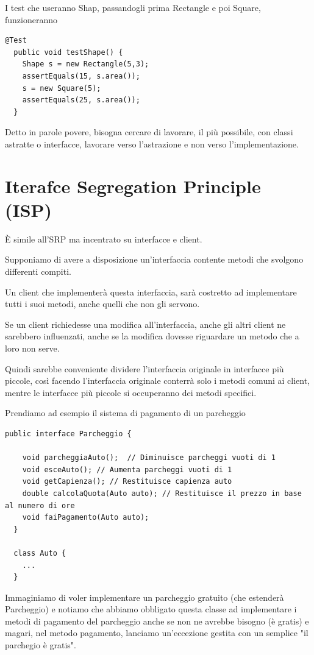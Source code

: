 I test che useranno Shap, passandogli prima Rectangle e poi Square, funzioneranno
\begin{lstlisting}[linewidth=6cm]
  @Test
  public void testShape() {
    Shape s = new Rectangle(5,3);
    assertEquals(15, s.area());
    s = new Square(5);
    assertEquals(25, s.area());
  }  
\end{lstlisting}

Detto in parole povere, bisogna cercare di lavorare, il più possibile, con classi astratte o interfacce, lavorare verso l'astrazione e non verso l'implementazione.

\newpage
\section{Iterafce Segregation Principle (ISP)}

È simile all’SRP ma incentrato su interfacce e client.

Supponiamo di avere a disposizione un'interfaccia contente metodi che svolgono differenti compiti.

Un client che implementerà questa interfaccia, sarà costretto ad implementare tutti i suoi metodi, anche quelli che non gli servono.

Se un client richiedesse una modifica all’interfaccia, anche gli altri client ne sarebbero influenzati, anche se la modifica dovesse riguardare un metodo che a loro
non serve.

Quindi sarebbe conveniente dividere l'interfaccia originale in interfacce più piccole, così facendo l'interfaccia originale conterrà solo i metodi comuni ai client, 
mentre le interfacce più piccole si occuperanno dei metodi specifici.

Prendiamo ad esempio il sistema di pagamento di un parcheggio

\begin{lstlisting}[linewidth=15cm]
  public interface Parcheggio {

    void parcheggiaAuto();	// Diminuisce parcheggi vuoti di 1
    void esceAuto(); // Aumenta parcheggi vuoti di 1
    void getCapienza();	// Restituisce capienza auto
    double calcolaQuota(Auto auto); // Restituisce il prezzo in base al numero di ore
    void faiPagamento(Auto auto);
  }

  class Auto {
    ...
  }
\end{lstlisting}

Immaginiamo di voler implementare un parcheggio gratuito (che estenderà Parcheggio) e notiamo che abbiamo obbligato questa classe ad implementare i metodi di pagamento
del parcheggio anche se non ne avrebbe bisogno (è gratis) e magari, nel metodo pagamento, lanciamo un'eccezione gestita con un semplice "il parchegio è gratis".

